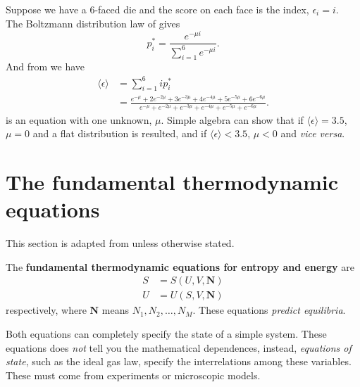 \begin{wex}
Suppose we have a $6$-faced die and the score on each face is the index, \ie $\epsilon_i=i$. \\
The Boltzmann distribution law of  gives
\begin{equation}
\label{ex_die1}
p^*_i=\frac{e^{-\mu i}}{\sum^6_{i=1}e^{-\mu i}}. 
\end{equation}
And from  we have
\begin{equation}
\begin{aligned}
\label{ex_die2}
\langle\epsilon\rangle&=\sum^6_{i=1}ip^*_i \\
&=\frac{e^{-\mu}+2e^{-2\mu}+3e^{-3\mu}+4e^{-4\mu}+5e^{-5\mu}+6e^{-6\mu}}{e^{-\mu}+e^{-2\mu}+e^{-3\mu}+e^{-4\mu}+e^{-5\mu}+e^{-6\mu}}. 
\end{aligned}
\end{equation}
 is an equation with one unknown, $\mu$. 
Simple algebra can show that if $\langle\epsilon\rangle=3.5$, $\mu=0$ and a flat distribution is resulted, 
and if $\langle\epsilon\rangle<3.5$, $\mu<0$ and \textit{vice versa}. 
\end{wex}

\section{The fundamental thermodynamic equations}
This section is adapted from \cite{dill} unless otherwise stated. 
\begin{thrm}
The \textbf{fundamental thermodynamic equations for entropy and energy} are 
\begin{subequations}
\begin{align}
S&=S(U,V,\boldsymbol{N}) \\
U&=U(S,V,\boldsymbol{N})
\end{align}
\end{subequations}
respectively, where $\boldsymbol{N}$ means $N_1,N_2,\dots,N_M$. These equations \textit{predict equilibria}. 
\end{thrm}
Both equations can completely specify the state of a simple system. 
These equations does \textit{not} tell you the mathematical dependences, instead, 
\textit{equations of state}, such as the ideal gas law, specify the interrelations 
among these variables. 
These must come from experiments or microscopic models. 
